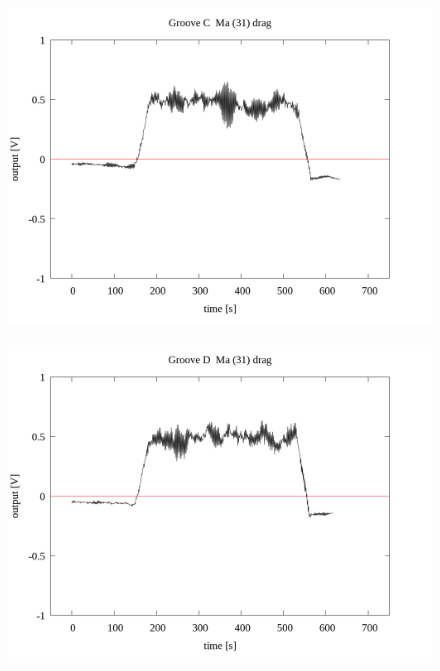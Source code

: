 \documentclass[a4paper]{jsarticle}
\begin{document}
\begin{figure}[htbp]
    \footnotesize
    \begin{center}
        \includegraphics[width=140mm]{../../../33_result/210806/moving_average/31/drag/Groove_C_ma(31)_drag.png}
    \end{center}
\end{figure}

\begin{figure}[htbp]
    \footnotesize
    \begin{center}
        \includegraphics[width=140mm]{../../../33_result/210806/moving_average/31/drag/Groove_D_ma(31)_drag.png}
    \end{center}
\end{figure}
\end{document}
